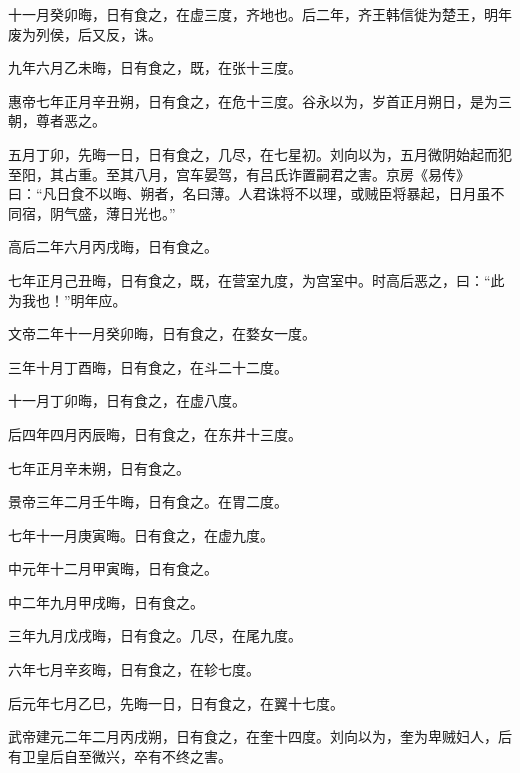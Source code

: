 \documentclass[12pt,UTF8]{ctexbook}
\begin{document}
十一月癸卯晦，日有食之，在虚三度，齐地也。后二年，齐王韩信徙为楚王，明年废为列侯，后又反，诛。



九年六月乙未晦，日有食之，既，在张十三度。



惠帝七年正月辛丑朔，日有食之，在危十三度。谷永以为，岁首正月朔日，是为三朝，尊者恶之。



五月丁卯，先晦一日，日有食之，几尽，在七星初。刘向以为，五月微阴始起而犯至阳，其占重。至其八月，宫车晏驾，有吕氏诈置嗣君之害。京房《易传》曰：“凡日食不以晦、朔者，名曰薄。人君诛将不以理，或贼臣将暴起，日月虽不同宿，阴气盛，薄日光也。”



高后二年六月丙戌晦，日有食之。



七年正月己丑晦，日有食之，既，在营室九度，为宫室中。时高后恶之，曰：“此为我也！”明年应。



文帝二年十一月癸卯晦，日有食之，在婺女一度。



三年十月丁酉晦，日有食之，在斗二十二度。



十一月丁卯晦，日有食之，在虚八度。



后四年四月丙辰晦，日有食之，在东井十三度。



七年正月辛未朔，日有食之。



景帝三年二月壬牛晦，日有食之。在胃二度。



七年十一月庚寅晦。日有食之，在虚九度。



中元年十二月甲寅晦，日有食之。



中二年九月甲戌晦，日有食之。



三年九月戊戌晦，日有食之。几尽，在尾九度。



六年七月辛亥晦，日有食之，在轸七度。



后元年七月乙巳，先晦一日，日有食之，在翼十七度。



武帝建元二年二月丙戌朔，日有食之，在奎十四度。刘向以为，奎为卑贼妇人，后有卫皇后自至微兴，卒有不终之害。
\end{document}
